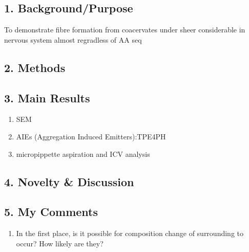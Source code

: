\documentclass{ltjsarticle}
\numberwithin{equation}{subsection}
\begin{document}
\subsection{1. Background/Purpose}
To demonstrate fibre formation from coacervates under sheer considerable in nervous system almost regradless of AA seq
\subsection{2. Methods}

\subsection{3. Main Results}
\begin{enumerate}
    \item SEM
    \item AIEs
    (Aggregation Induced Emitters):TPE4PH
    \item micropippette aspiration and ICV analysis   
\end{enumerate}
\subsection{4. Novelty \& Discussion}

\subsection{5. My Comments}
\begin{enumerate}
    \item In the first place, is it possible for composition change of surrounding to occur? How likely are they? 
\end{enumerate}
\end{document}
